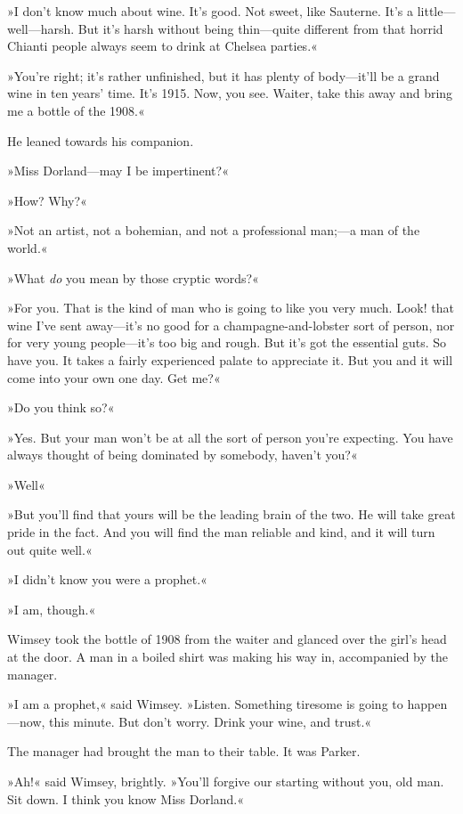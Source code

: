 »I don't know much about wine. It's good. Not sweet, like Sauterne. It's a little—well—harsh. But it's harsh without being thin—quite different from that horrid Chianti people always seem to drink at Chelsea parties.«

»You're right; it's rather unfinished, but it has plenty of body—it'll be a grand wine in ten years' time. It's 1915. Now, you see. Waiter, take this away and bring me a bottle of the 1908.«

He leaned towards his companion.

»Miss Dorland—may I be impertinent?«

»How? Why?«

»Not an artist, not a bohemian, and not a professional man;—a man of the world.«

»What \textit{do} you mean by those cryptic words?«

»For you. That is the kind of man who is going to like you very much. Look! that wine I've sent away—it's no good for a champagne-and-lobster sort of person, nor for very young people—it's too big and rough. But it's got the essential guts. So have you. It takes a fairly experienced palate to appreciate it. But you and it will come into your own one day. Get me?«

»Do you think so?«

»Yes. But your man won't be at all the sort of person you're expecting. You have always thought of being dominated by somebody, haven't you?«

»Well\longdash«

»But you'll find that yours will be the leading brain of the two. He will take great pride in the fact. And you will find the man reliable and kind, and it will turn out quite well.«

»I didn't know you were a prophet.«

»I am, though.«

Wimsey took the bottle of 1908 from the waiter and glanced over the girl's head at the door. A man in a boiled shirt was making his way in, accompanied by the manager.

»I am a prophet,« said Wimsey. »Listen. Something tiresome is going to happen—now, this minute. But don't worry. Drink your wine, and trust.«

The manager had brought the man to their table. It was Parker.

»Ah!« said Wimsey, brightly. »You'll forgive our starting without you, old man. Sit down. I think you know Miss Dorland.«

